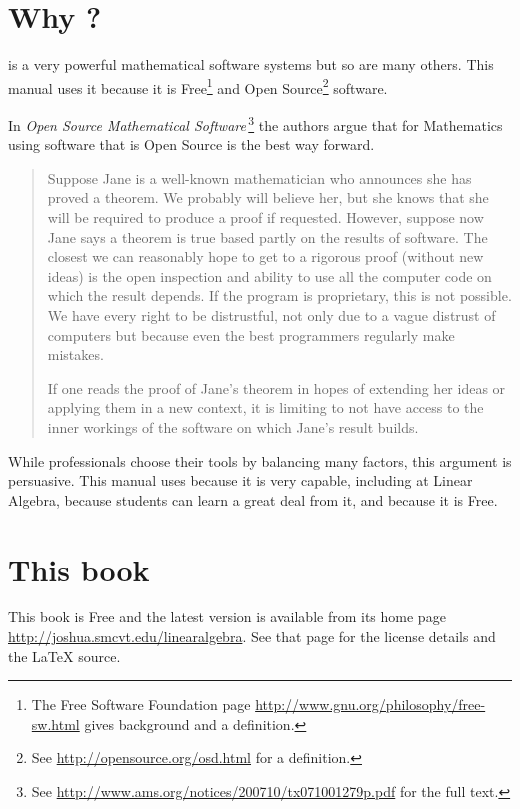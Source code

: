 \section{Why \Sage?}
\Sage{} is a very powerful mathematical software systems but so are
many others.
This manual uses it because it is 
Free\footnote{The Free Software Foundation page 
\protect\url{http://www.gnu.org/philosophy/free-sw.html} 
gives background and a definition.} 
and Open Source\footnote{See \protect\url{http://opensource.org/osd.html} 
for a definition.} software.

In 
\textit{Open Source Mathematical Software\,}\citep{JoynerStein07}\footnote{See 
\protect\url{http://www.ams.org/notices/200710/tx071001279p.pdf} for the 
full text.}
the authors argue that for Mathematics using software that is Open Source
is the best way forward.

\begin{quotation}\small
Suppose Jane is a well-known mathematician who announces
she has proved a theorem. We probably will believe
her, but she knows that she will be required to produce
a proof if requested. However, suppose now Jane says a
theorem is true based partly on the results of software. The
closest we can reasonably hope to get to a rigorous proof
(without new ideas) is the open inspection and ability to use
all the computer code on which the result depends. If the
program is proprietary, this is not possible. We have every
right to be distrustful, not only due to a vague distrust of
computers but because even the best programmers regularly
make mistakes.

If one reads the proof of Jane’s theorem in hopes of
extending her ideas or applying them in a new context, it
is limiting to not have access to the inner workings of the
software on which Jane’s result builds.
\end{quotation}  
While professionals choose their tools by balancing many factors,
this argument is persuasive.
This manual uses \Sage{} because it is very capable, 
including at Linear Algebra, because students can 
learn a great deal from it,
and because it is Free.


\section{This book}
This book is Free and
the latest version is available from its home page 
\url{http://joshua.smcvt.edu/linearalgebra}.
See that page for the license details and the \LaTeX{} source.

